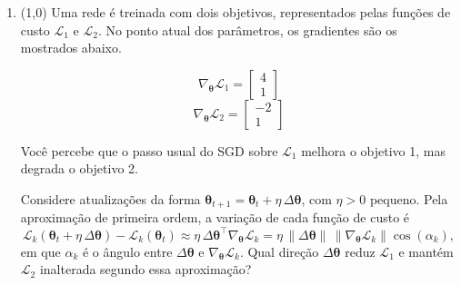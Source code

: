 \documentclass[11pt,a4paper]{article}
\begin{document}
\begin{enumerate}[1)]
\pagebreak
\item (1{,}0) Uma rede é treinada com dois objetivos, representados pelas funções de custo $\mathcal{L}_1$ e $\mathcal{L}_2$. No ponto atual dos parâmetros, os gradientes são os mostrados abaixo.

\begin{center}
\begin{minipage}{0.3\linewidth}
\[
\nabla_{\boldsymbol{\theta}}\mathcal{L}_1 = \begin{bmatrix} 4 \\ 1 \end{bmatrix}
\]
\[
\nabla_{\boldsymbol{\theta}}\mathcal{L}_2 = \begin{bmatrix} -2 \\ 1 \end{bmatrix}
\]
\end{minipage}%
\begin{minipage}{0.68\linewidth}\centering
{}
\end{minipage}
\end{center}

Você percebe que o passo usual do SGD sobre $\mathcal{L}_1$ melhora o objetivo 1, mas degrada o objetivo 2.

Considere atualizações da forma $\boldsymbol{\theta}_{t+1} = \boldsymbol{\theta}_t + \eta\,\Delta\boldsymbol{\theta}$, com $\eta > 0$ pequeno. Pela aproximação de primeira ordem, a variação de cada função de custo é
\[
\mathcal{L}_k(\boldsymbol{\theta}_t + \eta\,\Delta\boldsymbol{\theta}) - \mathcal{L}_k(\boldsymbol{\theta}_t)
\approx \eta\,\Delta\boldsymbol{\theta}^{\top}\nabla_{\boldsymbol{\theta}}\mathcal{L}_k
= \eta\,\|\Delta\boldsymbol{\theta}\|\,\|\nabla_{\boldsymbol{\theta}}\mathcal{L}_k\|\cos(\alpha_k),
\]
em que $\alpha_k$ é o ângulo entre $\Delta\boldsymbol{\theta}$ e $\nabla_{\boldsymbol{\theta}}\mathcal{L}_k$. Qual direção $\Delta\boldsymbol{\theta}$ reduz $\mathcal{L}_1$ e mantém $\mathcal{L}_2$ inalterada segundo essa aproximação?


\end{enumerate}
\end{document}

